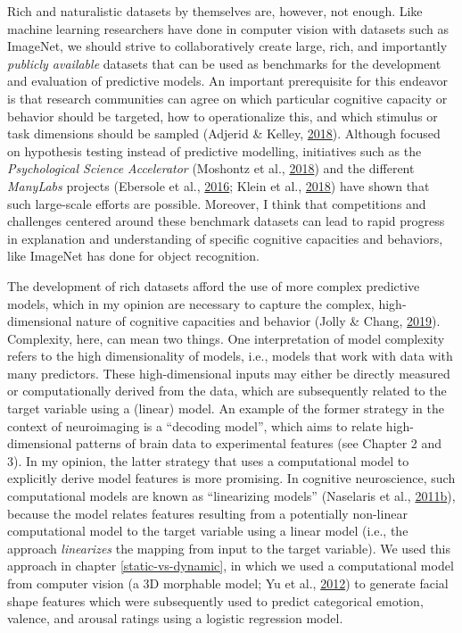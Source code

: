 \documentclass[11pt,american,a4paper,oneside,]{memoir} %
\begin{document}
Rich and naturalistic datasets by themselves are, however, not enough. Like machine learning researchers have done in computer vision with datasets such as ImageNet, we should strive to collaboratively create large, rich, and importantly \emph{publicly available} datasets that can be used as benchmarks for the development and evaluation of predictive models. An important prerequisite for this endeavor is that research communities can agree on which particular cognitive capacity or behavior should be targeted, how to operationalize this, and which stimulus or task dimensions should be sampled (Adjerid \& Kelley, \protect\hyperlink{ref-Adjerid2018-vs}{2018}). Although focused on hypothesis testing instead of predictive modelling, initiatives such as the \emph{Psychological Science Accelerator} (Moshontz et al., \protect\hyperlink{ref-Moshontz2018-rc}{2018}) and the different \emph{ManyLabs} projects (Ebersole et al., \protect\hyperlink{ref-Ebersole2016-cr}{2016}; Klein et al., \protect\hyperlink{ref-Klein2018-un}{2018}) have shown that such large-scale efforts are possible. Moreover, I think that competitions and challenges centered around these benchmark datasets can lead to rapid progress in explanation and understanding of specific cognitive capacities and behaviors, like ImageNet has done for object recognition.

The development of rich datasets afford the use of more complex predictive models, which in my opinion are necessary to capture the complex, high-dimensional nature of cognitive capacities and behavior (Jolly \& Chang, \protect\hyperlink{ref-Jolly2019-lx}{2019}). Complexity, here, can mean two things. One interpretation of model complexity refers to the high dimensionality of models, i.e., models that work with data with many predictors. These high-dimensional inputs may either be directly measured or computationally derived from the data, which are subsequently related to the target variable using a (linear) model. An example of the former strategy in the context of neuroimaging is a ``decoding model'', which aims to relate high-dimensional patterns of brain data to experimental features (see Chapter 2 and 3). In my opinion, the latter strategy that uses a computational model to explicitly derive model features is more promising. In cognitive neuroscience, such computational models are known as ``linearizing models'' (Naselaris et al., \protect\hyperlink{ref-Naselaris2011-oh}{2011}\protect\hyperlink{ref-Naselaris2011-oh}{b}), because the model relates features resulting from a potentially non-linear computational model to the target variable using a linear model (i.e., the approach \emph{linearizes} the mapping from input to the target variable). We used this approach in chapter \ref{static-vs-dynamic}, in which we used a computational model from computer vision (a 3D morphable model; Yu et al., \protect\hyperlink{ref-Yu2012-ag}{2012}) to generate facial shape features which were subsequently used to predict categorical emotion, valence, and arousal ratings using a logistic regression model.
\end{document}
